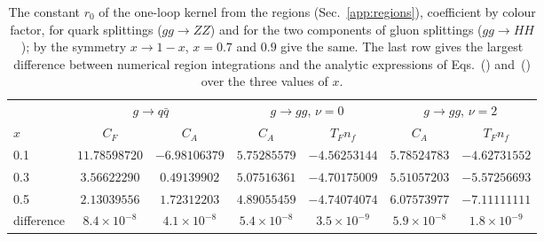 \begin{table}[!htb]
\centering
\small
\setlength{\tabcolsep}{4pt}
\begin{tabular}{lcccccc}
\toprule
& \multicolumn{2}{c}{$g\to q\bar q$} & \multicolumn{2}{c}{$g\to gg$, $\nu=0$} & \multicolumn{2}{c}{$g\to gg$, $\nu=2$}\\
\cmidrule(lr){2-3}\cmidrule(lr){4-5}\cmidrule(lr){6-7}
$x$ & $C_F$ & $C_A$ & $C_A$ & $T_Fn_f$ & $C_A$ & $T_Fn_f$\\
\midrule
0.1 & $11.78598720$ & $-6.98106379$ & $5.75285579$ & $-4.56253144$ & $5.78524783$ & $-4.62731552$\\
0.3 & $3.56622290$ & $0.49139902$ & $5.07516361$ & $-4.70175009$ & $5.51057203$ & $-5.57256693$\\
0.5 & $2.13039556$ & $1.72312203$ & $4.89055459$ & $-4.74074074$ & $6.07573977$ & $-7.11111111$\\
\midrule
difference & $8.4\times10^{-8}$ & $4.1\times10^{-8}$ & $5.4\times10^{-8}$ & $3.5\times10^{-9}$ & $5.9\times10^{-8}$ & $1.8\times10^{-9}$\\
\bottomrule
\end{tabular}
\caption{The constant $r_0$ of the one-loop kernel from the regions (Sec.~\ref{app:regions}), coefficient by colour factor, for quark splittings ($gg\to ZZ$) and for the two components of gluon splittings ($gg\to HH$); by the symmetry $x\to1-x$, $x=0.7$ and $0.9$ give the same. The last row gives the largest difference between numerical region integrations and the analytic expressions of Eqs.~() and~() over the three values of $x$.}
\label{tab:r0}
\end{table}
